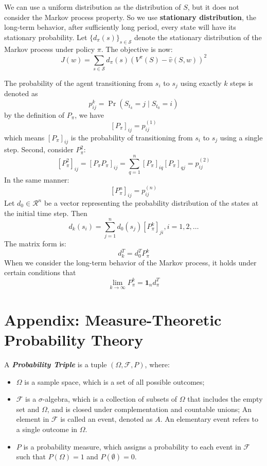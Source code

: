 \documentclass[10pt]{elegantbook}
\newcommand{\mydefination}[1]{\textbf{\textit{\textcolor{structurecolor}{#1}}}}
\begin{document}
We can use a uniform distribution as the distribution of $S$, but it does not consider the Markov process property. So we use \textbf{stationary distribution},
the long-term behavior, after sufficiently long period, every state will have its stationary probability. Let $\{ d_{\pi}(s) \}_{s \in \mathcal S}$ denote 
the stationary distribution of the Markov process under policy $\pi$. The objective is now:
\begin{equation}
    J(w) = \sum_{s \in \mathcal S} d_{\pi}(s) (V^{\pi}(S) - \hat v(S, w))^2
\end{equation}

\begin{definition}
    The probability of the agent transitioning from $s_i$ to $s_j$ using exactly $k$ steps is denoted as
    \[ p_{ij}^k = \Pr(S_{t_k} = j \mid S_{t_0} = i) \]
    by the definition of $P_{\pi}$, we have
    \[ [P_{\pi}]_{ij} = p_{ij}^{(1)} \]
    which means $[P_{\pi}]_{ij}$ is the probability of transitioning from $s_i$ to $s_j$ using a
single step. Second, consider $P^2_{\pi}$:
    \[ [P^2_{\pi}]_{ij} = [P_{\pi}P_{\pi}]_{ij} = \sum_{q=1}^n [P_{\pi}]_{iq}[P_{\pi}]_{qj} = p_{ij}^{(2)} \]
    In the same manner:
    \[ [P^n_{\pi}]_{ij} = p_{ij}^{(n)} \]
    Let $d_0 \in \mathcal R^n $ be a vector representing the probability distribution of the states at
the initial time step. Then 
    \begin{equation}
        d_k(s_i) = \sum_{j=1}^n d_0(s_j) [P^k_{\pi}]_{ji}, i = 1, 2, \ldots
    \end{equation}
    The matrix form is:
    \[ d_k^T = d_0^T P_{\pi}^k \]
    When we consider the long-term behavior of the Markov process, it holds under certain conditions that
    \[ \lim_{k \rightarrow \infty} P_{\pi}^k = \mathbf 1_n d_{\pi}^T \]
\end{definition}



\section{Appendix: Measure-Theoretic Probability Theory}
A \mydefination{Probability Triple} is a tuple $(\Omega, \mathcal F, P)$, where:
\begin{itemize}
    \item $\Omega$ is a sample space, which is a set of all possible outcomes;
    \item $\mathcal F$ is a $\sigma$-algebra, which is a collection of subsets of $\Omega$ that includes the empty set and $\Omega$, and is closed under complementation and countable unions;
    An element in $\mathcal F$ is called an event, denoted as $A$. An elementary event refers to a single outcome in $\Omega$.
    \item $P$ is a probability measure, which assigns a probability to each event in $\mathcal F$ such that $P(\Omega) = 1$ and $P(\emptyset) = 0$.
\end{itemize}
\end{document}
